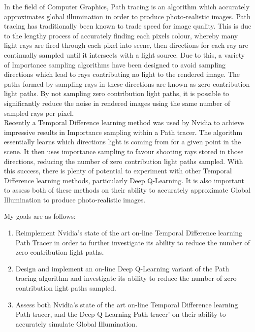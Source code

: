 \documentclass[ %
                    author={Callum Pearce},
                supervisor={Dr. Neill Campbell},
                    degree={MEng},
                     title={How effective are Temporal difference learning methods for reducing the number of zero contribution light paths while still accurately approximating Global Illumination in Path tracing?},
                  subtitle={},
                      type={research},
                      year={2019} ]{dissertation}
\begin{document}
In the field of Computer Graphics, Path tracing is an algorithm which 
accurately approximates global illumination in order to produce 
photo-realistic images. Path tracing has traditionally been known to 
trade speed for image quality. This is due to the lengthy process of accurately 
finding each pixels colour, whereby many light rays are 
fired through each pixel into scene, then directions for each ray are 
continually sampled until it intersects with a light source. Due to 
this, a variety of Importance sampling algorithms have been designed 
to avoid sampling directions which lead to rays contributing no light 
to the rendered image. The paths formed by sampling rays in these 
directions are known as zero contribution light paths. By not sampling 
zero contribution light paths, it is possible to significantly reduce 
the noise in rendered images using the same number of sampled rays per 
pixel.\\

Recently a Temporal Difference learning method was used by Nvidia to
achieve impressive results in Importance sampling within a Path tracer.
The algorithm essentially learns which directions light is coming from for
a given point in the scene. It then uses importance sampling to favour shooting
rays stored in those directions, reducing the number of zero contribution light paths
sampled. With this success, there is plenty of potential to experiment with
other Temporal Difference learning methods, particularly Deep Q-Learning.
It is also important to assess both of these methods on their ability to 
accurately approximate Global Illumination to produce photo-realistic images.

\noindent
My goals are as follows:

\begin{enumerate}
\item Reimplement Nvidia's state of the art on-line Temporal 
Difference learning Path Tracer in order to further investigate its ability
to reduce the number of zero contribution light paths.

\item Design and implement an on-line Deep Q-Learning variant of the
Path tracing algorithm and investigate its ability to reduce the number of zero contribution light paths sampled.

\item Assess both Nvidia's state of the art on-line Temporal Difference 
learning Path tracer, and the Deep Q-Learning Path tracer' on their ability 
to accurately simulate Global Illumination.

\end{enumerate}
\end{document}

